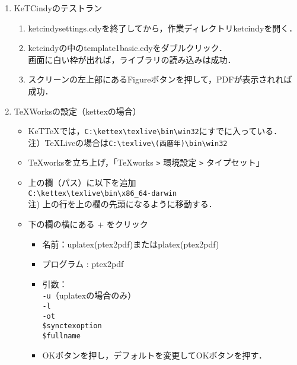 \documentclass{ujarticle}
\begin{document}
\begin{enumerate}[\bf\large 1.]
\item KeTCindyのテストラン
    \begin{enumerate}[(1)]
    \item ketcindysettings.cdyを終了してから，作業ディレクトリketcindyを開く．
    \item ketcindyの中のtemplate1basic.cdyをダブルクリック．\\
      \hspace*{10mm}画面に白い枠が出れば，ライブラリの読み込みは成功．
    \item スクリーンの左上部にあるFigureボタンを押して，PDFが表示されれば成功．
  \end{enumerate}

\item TeXWorksの設定（kettexの場合）
  \begin{itemize}
 \item KeTTeXでは，\verb|C:\kettex\texlive\bin\win32|にすでに入っている．\\
 \hspace*{5mm}注）TeXLiveの場合は\verb|C:\texlive\(西暦年)\bin\win32|
  \item TeXworksを立ち上げ，「TeXworks \verb|>| 環境設定 \verb|>| タイプセット」
  \item 上の欄（パス）に以下を追加\\
  \hspace*{5mm}\verb|C:\kettex\texlive\bin\x86_64-darwin|\\
  \hspace*{10mm}注) 上の行を上の欄の先頭になるように移動する．
  \item 下の欄の横にある + をクリック
    \begin{itemize}
    \item 名前：uplatex(ptex2pdf)またはplatex(ptex2pdf)
    \item プログラム : ptex2pdf
    \item 引数：\\
    \hspace*{10mm} \verb|-u|（uplatexの場合のみ）\\
    \hspace*{10mm} \verb|-l|\\
    \hspace*{10mm} \verb|-ot|\\
    \hspace*{10mm}  \verb|$synctexoption|\\
    \hspace*{10mm}  \verb|$fullname|
    \item[]OKボタンを押し，デフォルトを変更してOKボタンを押す．
    \end{itemize}
  \end{itemize}


\end{enumerate}
\end{document}
